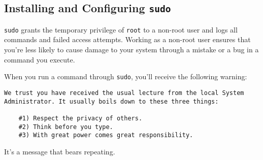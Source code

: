 \documentclass[12pt,letterpaper]{article}
\begin{document}
\subsection{Installing and Configuring \lstinline{sudo}}
\lstinline{sudo} grants the temporary privilege of \lstinline{root} to a non-root user and logs all commands and failed access attempts.  Working as a non-root user ensures that you're less likely to cause damage to your system through a mistake or a bug in a command you execute.

When you run a command through \lstinline{sudo}, you'll receive the following warning:
\begin{lstlisting}[basicstyle=\ttfamily\footnotesize]
We trust you have received the usual lecture from the local System
Administrator. It usually boils down to these three things:

    #1) Respect the privacy of others.
    #2) Think before you type.
    #3) With great power comes great responsibility.
\end{lstlisting}
It's a message that bears repeating.
\end{document}
